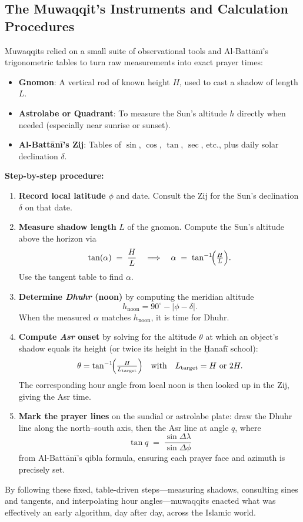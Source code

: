 \subsection{The Muwaqqit’s Instruments and Calculation Procedures}

Muwaqqits relied on a small suite of observational tools and Al-Battānī’s trigonometric tables to turn raw 
measurements into exact prayer times:

\begin{itemize}
  \item \textbf{Gnomon}: A vertical rod of known height \(H\), used to cast a shadow of length \(L\).
  \item \textbf{Astrolabe or Quadrant}: To measure the Sun’s altitude \(h\) directly when needed (especially near sunrise or sunset).
  \item \textbf{Al-Battānī’s Zij}: Tables of \(\sin\), \(\cos\), \(\tan\), \(\sec\), etc., plus daily solar declination \(\delta\).
\end{itemize}

\textbf{Step-by-step procedure:}

\begin{enumerate}
  \item \textbf{Record local latitude} \(\phi\) and date.  Consult the Zij for the Sun’s declination \(\delta\) on that date.
  \item \textbf{Measure shadow length} \(L\) of the gnomon.  Compute the Sun’s altitude above the horizon via
    \[
      \tan(\alpha) \;=\;\frac{H}{L}
      \quad\Longrightarrow\quad
      \alpha \;=\;\tan^{-1}\!\Bigl(\tfrac{H}{L}\Bigr).
    \]
    Use the tangent table to find \(\alpha\).
  \item \textbf{Determine \textit{Dhuhr} (noon)} by computing the meridian altitude
    \[
      h_{\mathrm{noon}}
      = 90^\circ - \bigl|\phi - \delta\bigr|.
    \]
    When the measured \(\alpha\) matches \(h_{\mathrm{noon}}\), it is time for Dhuhr.
  \item \textbf{Compute \textit{Asr} onset} by solving for the altitude \(\theta\) at which an object’s shadow equals its height (or twice its height in the Ḥanafī school):
    \[
      \theta = \tan^{-1}\!\Bigl(\tfrac{H}{L_{\mathrm{target}}}\Bigr)
      \quad\text{with}\quad
      L_{\mathrm{target}} = H \text{ or } 2H.
    \]
    The corresponding hour angle from local noon is then looked up in the Zij, giving the Asr time.
  \item \textbf{Mark the prayer lines} on the sundial or astrolabe plate: draw the Dhuhr line along the north–south axis, then the Asr line at angle \(q\), where
    \[
      \tan q \;=\;\frac{\sin\Delta\lambda}{\sin\Delta\phi}
    \]
    from Al-Battānī’s qibla formula, ensuring each prayer face and azimuth is precisely set.
\end{enumerate}

By following these fixed, table-driven steps—measuring shadows, consulting sines and tangents, and interpolating hour angles—muwaqqits enacted what was effectively an early algorithm, day after day, across the Islamic world.  
